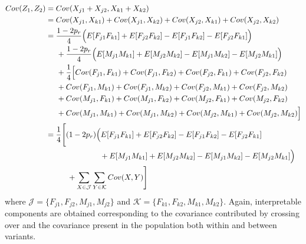 \documentclass{article}
\begin{document}
\begin{align*}
  Cov(Z_1, Z_2) & = Cov(X_{j1} + X_{j2}, X_{k1} + X_{k2}) \\
                & = Cov(X_{j1}, X_{k1}) + Cov(X_{j1}, X_{k2}) + Cov(X_{j2}, X_{k1}) + Cov(X_{j2}, X_{k2}) \\
                & = \frac{1 - 2 p_r}{4} \Big ( E[F_{j1} F_{k1}] + E[F_{j2} F_{k2}] - E[F_{j1} F_{k2}] - E[F_{j2} F_{k1}] \Big ) \\
                & \hspace{0.5cm} + \frac{1 - 2 p_r}{4} \Big ( E[M_{j1} M_{k1}] + E[M_{j2} M_{k2}] - E[M_{j1} M_{k2}] - E[M_{j2} M_{k1}] \Big ) \\
                & \hspace{0.5cm} + \frac{1}{4} \Big [ Cov(F_{j1}, F_{k1}) + Cov(F_{j1}, F_{k2}) + Cov(F_{j2}, F_{k1}) + Cov(F_{j2}, F_{k2}) \\
                & \hspace{0.5cm} + Cov(F_{j1}, M_{k1}) + Cov(F_{j1}, M_{k2}) + Cov(F_{j2}, M_{k1}) + Cov(F_{j2}, M_{k2}) \\
                & \hspace{0.5cm} + Cov(M_{j1}, F_{k1}) + Cov(M_{j1}, F_{k2}) + Cov(M_{j2}, F_{k1}) + Cov(M_{j2}, F_{k2}) \\
                & \hspace{0.5cm} + Cov(M_{j1}, M_{k1}) + Cov(M_{j1}, M_{k2}) + Cov(M_{j2}, M_{k1}) + Cov(M_{j2}, M_{k2}) \Big ] \\
                & = \frac{1}{4} \Bigg [ (1 - 2p_r) \Big ( E[F_{j1} F_{k1}] + E[F_{j2} F_{k2}] - E[F_{j1} F_{k2}] - E[F_{j2} F_{k1}] \\
                & \hspace{2.5cm} + E[M_{j1} M_{k1}] + E[M_{j2} M_{k2}] - E[M_{j1} M_{k2}] - E[M_{j2} M_{k1}] \Big )  \\
                & \hspace{1cm} + \sum_{X \in \mathcal{J}} \sum_{Y \in \mathcal{K}} Cov(X,Y) \Bigg ]
\end{align*}
where $\mathcal{J} = \{F_{j1}, F_{j2}, M_{j1}, M_{j2}\}$ and $\mathcal{K} =  \{F_{k1}, F_{k2}, M_{k1}, M_{k2}\}$. Again, interpretable components are obtained corresponding to the covariance contributed by crossing over and the covariance present in the population both within and between variants.
\end{document}
